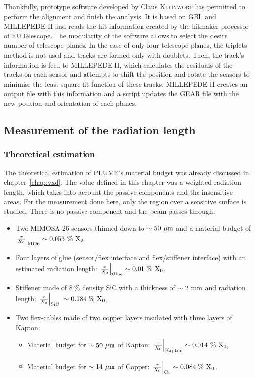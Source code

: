     Thankfully, prototype software developed by Claus \textsc{Kleinwort} has permitted to perform the alignment and finish the analysis. 
    It is based on \gls{GBL} and MILLEPEDE-II and reads the hit information created by the hitmaker processor of EUTelescope. 
    The modularity of the software allows to select the desire number of telescope planes.
    In the case of only four telescope planes, the triplets method is not used and tracks are formed only with doublets.
    Then, the track's information is feed to MILLEPEDE-II, which calculates the residuals of the tracks on each sensor and attempts to shift the position and rotate the sensors to minimise the least square fit function of these tracks.
    MILLEPEDE-II creates an output file with this information and a script updates the GEAR file with the new position and orientation of each planes.


   \subsection{Measurement of the radiation length}

     \subsubsection{Theoretical estimation}

     The theoretical estimation of \gls{PLUME}'s material budget was already discussed in chapter~\ref{chap:vxd}.
     The value defined in this chapter was a weighted radiation length, which takes into account the passive components and the insensitive areas.
     For the measurement done here, only the region over a sensitive surface is studied.
     There is no passive component and the beam passes through:
     
     \begin{itemize}
       \item Two \gls{MIMOSA}-26 sensors thinned down to $\sim 50~\rm{\mu m}$ and a material budget of $\left. \frac{x}{X_0} \right|_{\rm{Mi26}} \sim 0.053~\%~\rm{X_{0}}$,
       \item Four layers of glue (sensor/flex interface and flex/stiffener interface) with an estimated radiation length: $\left. \frac{x}{X_0} \right|_{\rm{Glue}} \sim 0.01~\%~\rm{X_0}$,
       \item Stiffener made of $8~\%$ density \gls{SiC} with a thickness of $\sim 2~\rm{mm}$ and radiation length: $\left. \frac{x}{X_0} \right|_{\rm{SiC}} ~\sim 0.184~\%~\rm{X_{0}}$,
       \item Two flex-cables made of two copper layers insulated with three layers of Kapton:
       \begin{itemize}
         \item Material budget for $\sim 50~\rm{\mu m}$ of Kapton: $\left. \frac{x}{X_0} \right|_{\rm{Kapton}} \sim 0.014~\%~\rm{X_{0}}$,
         \item Material budget for $\sim 14~\rm{\mu m}$ of Copper: $\left. \frac{x}{X_0} \right|_{\rm{Cu}} \sim 0.084~\%~\rm{X_{0}}$.
       \end{itemize}
     \end{itemize}

